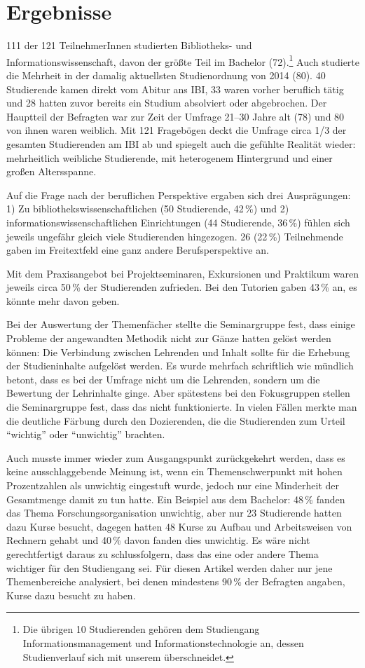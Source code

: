 \documentclass[a4paper,
fontsize=11pt,
oneside,
numbers=noperiodatend,
parskip=half-,
bibliography=totoc,
final
]{scrartcl}
\begin{document}
\hypertarget{ergebnisse}{%
\section{Ergebnisse}\label{ergebnisse}}

111 der 121 TeilnehmerInnen studierten Bibliotheks- und
Informationswissenschaft, davon der größte Teil im Bachelor
(72).\footnote{Die übrigen 10 Studierenden gehören dem Studiengang
  Informationsmanagement und Informationstechnologie an, dessen
  Studienverlauf sich mit unserem überschneidet.} Auch studierte die
Mehrheit in der damalig aktuellsten Studienordnung von 2014 (80). 40
Studierende kamen direkt vom Abitur ans IBI, 33 waren vorher beruflich
tätig und 28 hatten zuvor bereits ein Studium absolviert oder
abgebrochen. Der Hauptteil der Befragten war zur Zeit der Umfrage 21--30
Jahre alt (78) und 80 von ihnen waren weiblich. Mit 121 Fragebögen deckt
die Umfrage circa 1/3 der gesamten Studierenden am IBI ab und spiegelt
auch die gefühlte Realität wieder: mehrheitlich weibliche Studierende,
mit heterogenem Hintergrund und einer großen Altersspanne.

Auf die Frage nach der beruflichen Perspektive ergaben sich drei
Ausprägungen: 1) Zu bibliothekswissenschaftlichen (50 Studierende, 42\,\%)
und 2) informationswissenschaftlichen Einrichtungen (44 Studierende,
36\,\%) fühlen sich jeweils ungefähr gleich viele Studierenden hingezogen.
26 (22\,\%) Teilnehmende gaben im Freitextfeld eine ganz andere
Berufsperspektive an.

Mit dem Praxisangebot bei Projektseminaren, Exkursionen und Praktikum
waren jeweils circa 50\,\% der Studierenden zufrieden. Bei den Tutorien
gaben 43\,\% an, es könnte mehr davon geben.

Bei der Auswertung der Themenfächer stellte die Seminargruppe fest, dass
einige Probleme der angewandten Methodik nicht zur Gänze hatten gelöst
werden können: Die Verbindung zwischen Lehrenden und Inhalt sollte für
die Erhebung der Studieninhalte aufgelöst werden. Es wurde mehrfach
schriftlich wie mündlich betont, dass es bei der Umfrage nicht um die
Lehrenden, sondern um die Bewertung der Lehrinhalte ginge. Aber
spätestens bei den Fokusgruppen stellen die Seminargruppe fest, dass das
nicht funktionierte. In vielen Fällen merkte man die deutliche Färbung
durch den Dozierenden, die die Studierenden zum Urteil \enquote{wichtig}
oder \enquote{unwichtig} brachten.

Auch musste immer wieder zum Ausgangspunkt zurückgekehrt werden, dass es
keine ausschlaggebende Meinung ist, wenn ein Themenschwerpunkt mit hohen
Prozentzahlen als unwichtig eingestuft wurde, jedoch nur eine Minderheit
der Gesamtmenge damit zu tun hatte. Ein Beispiel aus dem Bachelor: 48\,\%
fanden das Thema Forschungsorganisation unwichtig, aber nur 23
Studierende hatten dazu Kurse besucht, dagegen hatten 48 Kurse zu Aufbau
und Arbeitsweisen von Rechnern gehabt und 40\,\% davon fanden dies
unwichtig. Es wäre nicht gerechtfertigt daraus zu schlussfolgern, dass
das eine oder andere Thema wichtiger für den Studiengang sei. Für diesen
Artikel werden daher nur jene Themenbereiche analysiert, bei denen
mindestens 90\,\% der Befragten angaben, Kurse dazu besucht zu haben.
\end{document}
